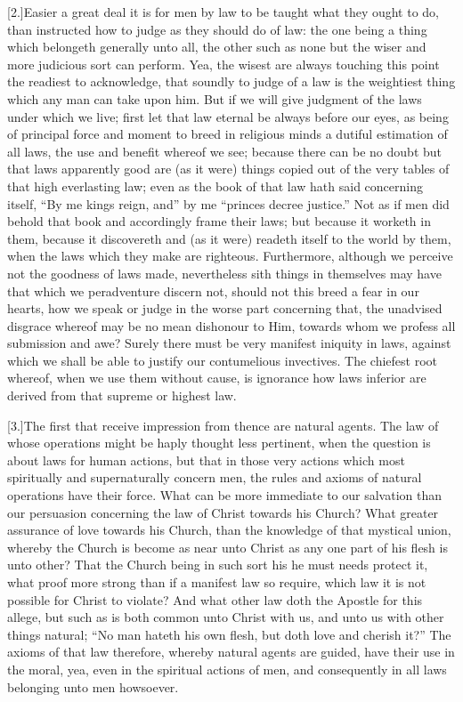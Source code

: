 [2.]Easier a great deal it is for men by law to be taught what they ought to do, than instructed how to judge as they should do of law: the one being a thing which belongeth generally unto all, the other such as none but the wiser and more judicious sort can perform. Yea, the wisest are always touching this point the readiest to acknowledge, that soundly to judge of a law is the weightiest thing which any man can take upon him. But if we will give judgment of the laws under which we live; first let that law eternal be always before our eyes, as being of principal force and moment to breed in religious minds a dutiful estimation of all laws, the use and benefit whereof we see; because there can be no doubt but that laws apparently good are (as it were) things copied out of the very tables of that high everlasting law; even as the book of that law hath said concerning itself, “By me kings reign, and” by me “princes decree justice.” Not as if men did behold that book and accordingly frame their laws; but because it worketh in them, because it discovereth and (as it were) readeth itself to the world by them, when the laws which they make are righteous. Furthermore, although we perceive not the goodness of laws made, nevertheless sith things in themselves may have that which we peradventure discern not, should not this breed a fear in our hearts, how we speak or judge in the worse part concerning that, the unadvised  disgrace whereof may be no mean dishonour to Him, towards whom we profess all submission and awe? Surely there must be very manifest iniquity in laws, against which we shall be able to justify our contumelious invectives. The chiefest root whereof, when we use them without cause, is ignorance how laws inferior are derived from that supreme or highest law.

[3.]The first that receive impression from thence are natural agents. The law of whose operations might be haply thought less pertinent, when the question is about laws for human actions, but that in those very actions which most spiritually and supernaturally concern men, the rules and axioms of natural operations have their force. What can be more immediate to our salvation than our persuasion concerning the law of Christ towards his Church? What greater assurance of love towards his Church, than the knowledge of that mystical union, whereby the Church is become as near unto Christ as any one part of his flesh is unto other? That the Church being in such sort his he must needs protect it, what proof more strong than if a manifest law so require, which law it is not possible for Christ to violate? And what other law doth the Apostle for this allege, but such as is both common unto Christ with us, and unto us with other things natural; “No man hateth his own flesh, but doth love and cherish it?” The axioms of that law therefore, whereby natural agents are guided, have their use in the moral, yea, even in the spiritual actions of men, and consequently in all laws belonging unto men howsoever.

